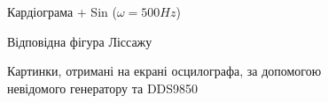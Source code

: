 \begin{figure}[h]
\begin{minipage}[h]{0.47\linewidth}
	\end{minipage}
	\vfill
	\begin{minipage}[h]{0.47\linewidth}
		 Кардіограма + Sin ($\omega = 500Hz$) \\
	\end{minipage}
	\hfill
	\begin{minipage}[h]{0.47\linewidth}
		 Відповідна фігура Ліссажу \\
	\end{minipage}
	\caption{Картинки, отримані на екрані осцилографа, за допомогою невідомого генератору та DDS9850}
	\label{fig:part2}
\end{figure}

